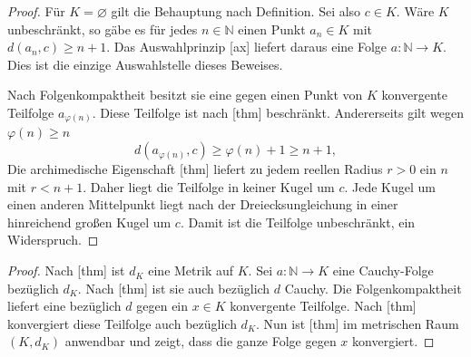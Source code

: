 \documentclass[main.tex]{subfiles}
\begin{document}
\begin{proof}
Für \(K=\varnothing\) gilt die Behauptung nach Definition. Sei also
\(c\in K\). Wäre \(K\) unbeschränkt, so gäbe es für jedes
  \(n\in\mathbb N\) einen Punkt \(a_n\in K\) mit
\(d(a_n,c)\geq n+1\). Das Auswahlprinzip
[ax] liefert daraus eine Folge
\(a\colon\mathbb N\to K\). Dies ist die einzige Auswahlstelle dieses
Beweises.

Nach Folgenkompaktheit besitzt sie eine gegen einen Punkt von \(K\)
konvergente Teilfolge \(a_{\varphi(n)}\). Diese Teilfolge ist nach
[thm] beschränkt. Andererseits
gilt wegen \(\varphi(n)\geq n\)
\[
 d(a_{\varphi(n)},c)\geq\varphi(n)+1\geq n+1,
\]
Die archimedische Eigenschaft
[thm] liefert zu jedem reellen Radius
\(r>0\) ein \(n\) mit \(r<n+1\). Daher liegt die Teilfolge in keiner Kugel um
\(c\). Jede Kugel um einen anderen Mittelpunkt liegt nach der
Dreiecksungleichung in einer hinreichend großen Kugel um \(c\). Damit ist die
Teilfolge unbeschränkt, ein Widerspruch.
\end{proof}

\begin{proof}
Nach [thm] ist \(d_K\) eine
Metrik auf \(K\). Sei \(a\colon\mathbb N\to K\) eine Cauchy-Folge bezüglich
\(d_K\). Nach [thm] ist sie auch
bezüglich \(d\) Cauchy. Die Folgenkompaktheit liefert eine bezüglich \(d\)
gegen ein \(x\in K\) konvergente Teilfolge. Nach
[thm] konvergiert diese
Teilfolge auch bezüglich \(d_K\). Nun ist
[thm] im metrischen Raum
\((K,d_K)\) anwendbar und zeigt, dass die ganze Folge gegen \(x\) konvergiert.
\end{proof}
\end{document}
